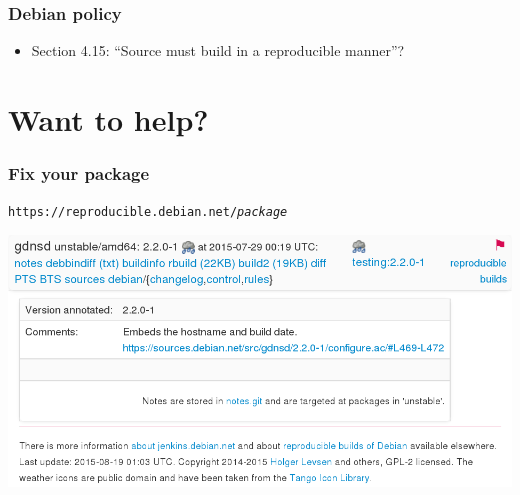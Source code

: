 \documentclass[14pt]{beamer}
\begin{document}
\begin{frame}[plain]
\end{frame}

\begin{frame}
 \frametitle{Debian policy}

 \begin{itemize}
  \item Section 4.15: “Source must build in a reproducible manner”? 
 \end{itemize}
\end{frame}

\section{Want to help?}

\begin{frame}
 \frametitle{Fix your package}

 \begin{center}
  \texttt{https://reproducible.debian.net/\textit{package}}

  \includegraphics[width=\linewidth]{images/rdn-gdnsd.png}
 \end{center}
\end{frame}
\end{document}

